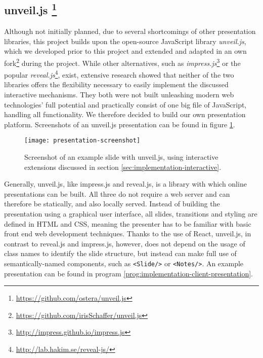 \subsection[unveil.js]%
             {unveil.js%
             \protect\footnote{\url{https://github.com/ostera/unveil.js}}}    
\label{sec:implementation-technologies-unveil}
Although not initially planned, due to several shortcomings of other presentation libraries, this project builds upon the open-source JavaScript library \textit{unveil.js}, which we developed prior to this project and extended and adapted in an own fork\footnote{\url{https://github.com/irisSchaffer/unveil.js}} during the project. While other alternatives, such as \emph{impress.js}\footnote{\url{http://impress.github.io/impress.js}} or the popular \emph{reveal.js}\footnote{\url{http://lab.hakim.se/reveal-js/}}, exist, extensive research showed that neither of the two libraries offers the flexibility necessary to easily implement the discussed interactive mechanisms. They both were not built unleashing modern web technologies' full potential and practically consist of one big file of JavaScript, handling all functionality. We therefore decided to build our own presentation platform. Screenshots of an unveil.js presentation can be found in figure \ref{fig:implementation-technologies-unveil-screenshots}.
%
\begin{figure}
\centering
\texttt{[image: presentation-screenshot]}
\caption{Screenshot of an example slide with unveil.js, using interactive extensions discussed in section \ref{sec:implementation-interactive}.}
\label{fig:implementation-technologies-unveil-screenshots}
\end{figure}
%
Generally, unveil.js, like impress.js and reveal.js, is a library with which online presentations can be built. All three do not require a web server and can therefore be statically, and also locally served. Instead of building the presentation using a graphical user interface, all slides, transitions and styling are defined in HTML and CSS, meaning the presenter has to be familiar with basic front end web development techniques. Thanks to the use of React, unveil.js, in contrast to reveal.js and impress.js, however, does not depend on the usage of class names to identify the slide structure, but instead can make full use of semantically-named components, such as \texttt{<Slide/>} or \texttt{<Notes/>}. An example presentation can be found in program \ref{prog:implementation-client-presentation}.

